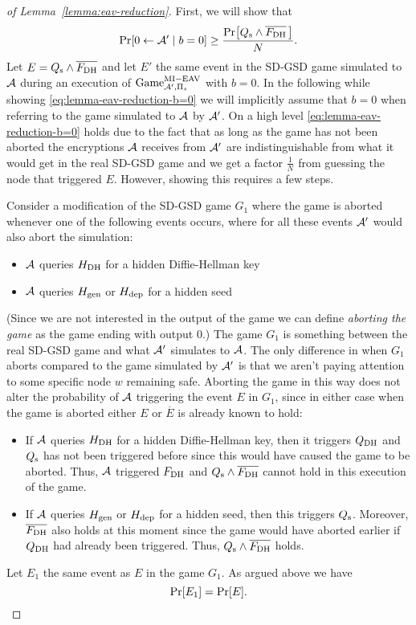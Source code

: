 \begin{proof}[of Lemma~\ref{lemma:eav-reduction}]
	First, we will show that
	\begin{equation} \label{eq:lemma-eav-reduction-b=0}
		\pr{0 \from \adv' \mid b = 0} \ge \frac{\pr{\qs \land \overline{\fdh}\,}}{N}.
	\end{equation}
	Let $E = Q_\mathrm{s} \land \overline{F_\mathrm{DH}}$ and let $E'$ the same event in the SD-GSD game simulated to $\mathcal{A}$ during an execution of $\mathrm{Game}_{\mathcal{A}', \Pi_s}^{\mathrm{MI-EAV}}$ with $b = 0$. In the following while showing \eqref{eq:lemma-eav-reduction-b=0} we will implicitly assume that $b = 0$ when referring to the game simulated to $\mathcal{A}$ by $\mathcal{A}'$.
	On a high level \eqref{eq:lemma-eav-reduction-b=0} holds due to the fact that as long as the game has not been aborted the encryptions $\mathcal{A}$ receives from $\mathcal{A}'$ are indistinguishable from what it would get in the real SD-GSD game and we get a factor $\frac{1}{N}$ from guessing the node that triggered $E$. However, showing this requires a few steps.

	Consider a modification of the SD-GSD game $G_1$ where the game is aborted whenever one of the following events occurs, where for all these events $\mathcal{A}'$ would also abort the simulation:
	\begin{itemize}
		\item $\mathcal{A}$ queries $H_\mathrm{DH}$ for a hidden Diffie-Hellman key
		\item $\mathcal{A}$ queries $H_\mathrm{gen}$ or $H_\mathrm{dep}$ for a hidden seed
	\end{itemize}
	(Since we are not interested in the output of the game we can define \emph{aborting the game} as the game ending with output 0.) The game $G_1$ is something between the real SD-GSD game and what $\mathcal{A}'$ simulates to $\mathcal{A}$. The only difference in when $G_1$ aborts compared to the game simulated by $\mathcal{A}'$ is that we aren't paying attention to some specific node $w$ remaining safe. Aborting the game in this way does not alter the probability of $\mathcal{A}$ triggering the event $E$ in $G_1$, since in either case when the game is aborted either $E$ or $\overline{E}$ is already known to hold:
	\begin{itemize}
		\item If $\mathcal{A}$ queries $H_\mathrm{DH}$ for a hidden Diffie-Hellman key, then it triggers $Q_\mathrm{DH}$ and $Q_\mathrm{s}$ has not been triggered before since this would have caused the game to be aborted. Thus, $\mathcal{A}$ triggered $F_\mathrm{DH}$ and $Q_\mathrm{s} \land \overline{F_\mathrm{DH}}$ cannot hold in this execution of the game.
		\item If $\mathcal{A}$ queries $H_\mathrm{gen}$ or $H_\mathrm{dep}$ for a hidden seed, then this triggers $Q_\mathrm{s}$. Moreover, $\overline{F_\mathrm{DH}}$ also holds at this moment since the game would have aborted earlier if $Q_\mathrm{DH}$ had already been triggered. Thus, $Q_\mathrm{s} \land \overline{F_\mathrm{DH}}$ holds.
	\end{itemize}
	Let $E_1$ the same event as $E$ in the game $G_1$. As argued above we have
	\begin{equation} \label{eq:lemma-eav-reduction-E=E_1}
		\pr{E_1} = \pr{E}.
	\end{equation}



\end{proof}

